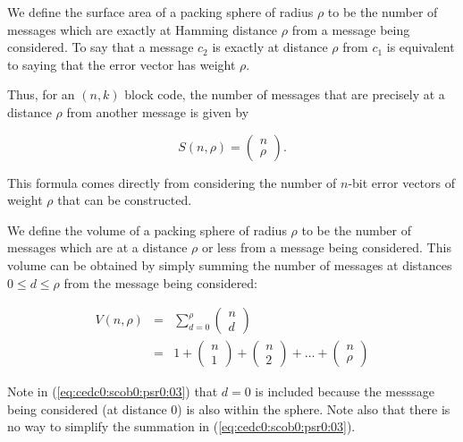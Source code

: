 We define the surface area of a packing sphere of radius $\rho$ to be the 
number of messages which are exactly at Hamming distance $\rho$ from a message
being considered.  To say that a message $c_2$ is exactly at distance
$\rho$ from $c_1$ is equivalent to saying that the error vector has weight $\rho$.

Thus, for an $(n,k)$ block code, the number of messages that are precisely
at a distance $\rho$ from another message is given by

\begin{equation}
\label{eq:cedc0:scob0:psr0:02}
S(n, \rho ) = \left({\begin{array}{cc}n\\\rho\end{array}}\right) .
\end{equation}

\noindent{}This formula comes directly from considering the
number of $n$-bit error vectors of weight $\rho$ that can be constructed.

We define the volume of a packing sphere of radius $\rho$ to be the
number of messages which are at a distance $\rho$ or less from a 
message being considered.  This volume can be obtained by 
simply summing the number of messages at distances
$0 \leq d \leq \rho$ from the message being considered:

\begin{eqnarray}
\label{eq:cedc0:scob0:psr0:03}
V(n, \rho ) & = & \sum_{d=0}^{\rho} \left({\begin{array}{cc}n\\d\end{array}}\right) \\
\nonumber
& = & 1 
+ \left({\begin{array}{cc}n\\1\end{array}}\right)
+ \left({\begin{array}{cc}n\\2\end{array}}\right)
+ \ldots{}
+ \left({\begin{array}{cc}n\\\rho\end{array}}\right)
\end{eqnarray}

\noindent{}Note in (\ref{eq:cedc0:scob0:psr0:03})
that $d=0$ is included because the messsage being considered
(at distance 0) is also within the sphere.  Note also that there is no
way to simplify the summation in (\ref{eq:cedc0:scob0:psr0:03}).


